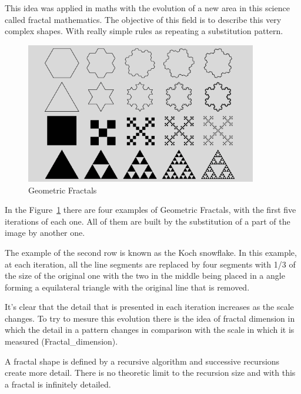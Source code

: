This idea was applied in maths with the evolution of a new area in this science called fractal mathematics. The objective of this field is to describe this very complex shapes. With really simple rules as repeating a substitution pattern. 

\begin{figure}[htbp]
	\centering
	\includegraphics[width=0.9\textwidth]{img/Theory/Fractals/Fractal1_1000.png}
	\caption{Geometric Fractals}
	\label{fig:GFractals}
\end{figure}

In the Figure~\ref{fig:GFractals} there are four examples of Geometric Fractals, with the first five iterations of each one. All of them are built by the substitution of a part of the image by another one. 

The example of the second row is known as the Koch snowflake. In this example, at each iteration, all the line segments are replaced by four segments with 1/3 of the size of the original one with the two in the middle being placed in a angle forming a equilateral triangle with the original line that is removed.

It's clear that the detail that is presented in each iteration increases as the scale changes. To try to mesure this evolution there is the idea of ​​fractal dimension in which the detail in a pattern changes in comparison with the scale in which it is measured (Fractal\_dimension). 

A fractal shape is defined by a recursive algorithm and successive recursions create more detail. There is no theoretic limit to the recursion size and with this a fractal is infinitely detailed. 



